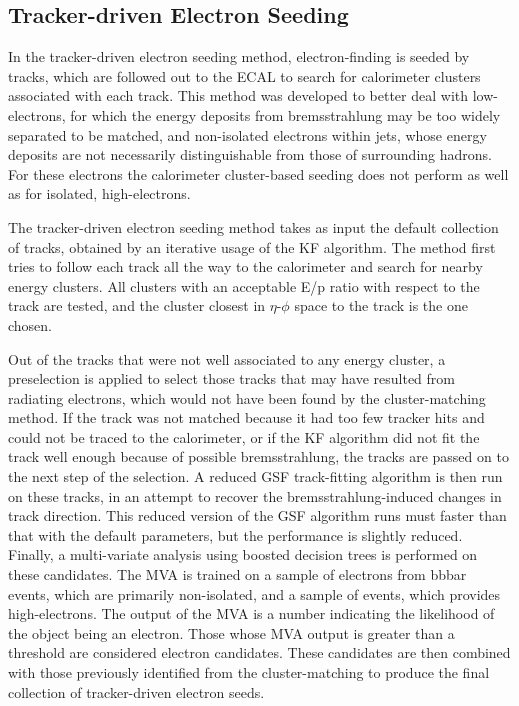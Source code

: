 \subsection{Tracker-driven Electron Seeding}
\label{evReco:trkDrv}
In the tracker-driven electron seeding method, 
electron-finding is seeded by tracks, 
which are followed out to the 
ECAL to search for calorimeter clusters 
associated with each track.  
This method was developed to better deal with 
low-\pT electrons, for which the energy deposits 
from bremsstrahlung may be too widely separated 
to be matched,  
and non-isolated electrons within jets, 
whose energy deposits are not necessarily 
distinguishable from those of surrounding hadrons.  
For these electrons the calorimeter cluster-based 
seeding does not perform as well as for 
isolated, high-\pT electrons.  

The tracker-driven electron seeding method 
takes as input the default collection 
of tracks, obtained by an iterative usage 
of the KF algorithm.  
The method first tries to follow each track 
all the way to the calorimeter and search 
for nearby energy clusters.  
All clusters with an acceptable E/p ratio 
with respect to the track are tested, 
and the cluster closest in $\eta$-$\phi$ 
space to the track is the one chosen. 
 
Out of the tracks that were not 
well associated to any energy cluster, 
a preselection is applied to select 
those tracks that may have resulted from 
radiating electrons, 
which would not have been found 
by the cluster-matching method.  
If the track was not matched because it had 
too few tracker hits and could not be traced 
to the calorimeter, 
or if the KF algorithm did not fit the 
track well enough because of possible 
bremsstrahlung, the tracks are passed 
on to the next step of the selection.  
A reduced GSF track-fitting algorithm 
is then run on these tracks, 
in an attempt to recover the 
bremsstrahlung-induced changes in track direction. 
This reduced version of the GSF algorithm runs 
must faster than that with the default parameters, 
but the performance is slightly reduced.  
Finally, a multi-variate analysis using 
boosted decision trees 
is performed on these candidates.  
The MVA is trained on a sample of electrons from 
bbbar events, which are primarily non-isolated, 
and a sample of \Zee events, 
which provides high-\pT electrons.  
The output of the MVA is a number indicating 
the likelihood of the object being an electron.   
Those whose MVA output is greater than a threshold 
are considered electron candidates. 
These candidates are then combined with those 
previously identified from the cluster-matching 
to produce the final collection of 
tracker-driven electron seeds.  

